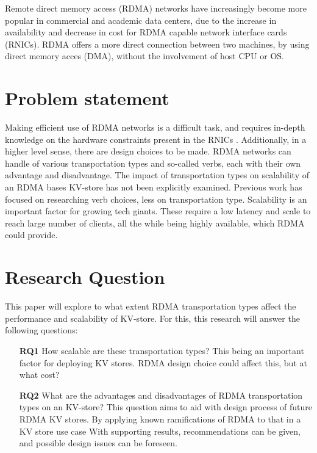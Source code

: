 Remote direct memory access (RDMA) networks have increasingly become more popular in commercial and academic data centers, due to the increase in availability and decrease in cost for RDMA capable network interface cards (RNICs)\cite{kalia2016design, chen2019scalable}.
RDMA offers a more direct connection between two machines, by using direct memory acces (DMA), without the involvement of host CPU or OS.

\section{Problem statement}
Making efficient use of RDMA networks is a difficult task, and requires in-depth knowledge on the hardware constraints present in the RNICs \cite{kalia2016design, chen2019scalable}.
Additionally, in a higher level sense, there are design choices to be made.
RDMA networks can handle of various transportation types and so-called verbs, each with their own advantage and disadvantage.
The impact of transportation types on scalability of an RDMA bases KV-store has not been explicitly examined.
Previous work has focused on researching verb choices, less on transportation type\cite{kalia2014using, kalia2016fasst, mitchell2013using}.
Scalability is an important factor for growing tech giants.
These require a low latency and scale to reach large number of clients, all the while being highly available\cite{decandia2007dynamo}, which RDMA could provide.

\section{Research Question}
This paper will explore to what extent RDMA transportation types affect the performance and scalability of KV-store.
For this, this research will answer the following questions:

\begin{itemize}
    \item[\textbf{RQ1}] How scalable are these transportation types?%
    This being an important factor for deploying KV stores.
    RDMA design choice could affect this, but at what cost?
    \item[\textbf{RQ2}] What are the advantages and disadvantages of RDMA transportation types on an KV-store?
    This question aims to aid with design process of future RDMA KV stores.
    By applying known ramifications of RDMA to that in a KV store use case
    With supporting results, recommendations can be given, and possible design issues can be foreseen.
\end{itemize}

